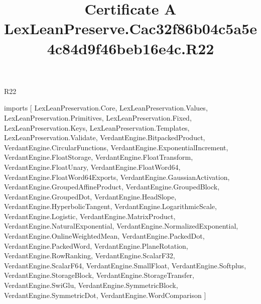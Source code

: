 \begin{lexlean}{R22}
\title{Certificate A LexLeanPreserve.Cac32f86b04c5a5e4c84d9f46beb16e4c.R22}
\begin{coremodule}
imports [
  LexLeanPreservation.Core,
  LexLeanPreservation.Values,
  LexLeanPreservation.Primitives,
  LexLeanPreservation.Fixed,
  LexLeanPreservation.Keys,
  LexLeanPreservation.Templates,
  LexLeanPreservation.Validate,
  VerdantEngine.BitpackedProduct,
  VerdantEngine.CircularFunctions,
  VerdantEngine.ExponentialIncrement,
  VerdantEngine.FloatStorage,
  VerdantEngine.FloatTransform,
  VerdantEngine.FloatUnary,
  VerdantEngine.FloatWord64,
  VerdantEngine.FloatWord64Exports,
  VerdantEngine.GaussianActivation,
  VerdantEngine.GroupedAffineProduct,
  VerdantEngine.GroupedBlock,
  VerdantEngine.GroupedDot,
  VerdantEngine.HeadSlope,
  VerdantEngine.HyperbolicTangent,
  VerdantEngine.LogarithmicScale,
  VerdantEngine.Logistic,
  VerdantEngine.MatrixProduct,
  VerdantEngine.NaturalExponential,
  VerdantEngine.NormalizedExponential,
  VerdantEngine.OnlineWeightedMean,
  VerdantEngine.PackedDot,
  VerdantEngine.PackedWord,
  VerdantEngine.PlaneRotation,
  VerdantEngine.RowRanking,
  VerdantEngine.ScalarF32,
  VerdantEngine.ScalarF64,
  VerdantEngine.SmallFloat,
  VerdantEngine.Softplus,
  VerdantEngine.StorageBlock,
  VerdantEngine.StorageTransfer,
  VerdantEngine.SwiGlu,
  VerdantEngine.SymmetricBlock,
  VerdantEngine.SymmetricDot,
  VerdantEngine.WordComparison
]


\end{coremodule}
\end{lexlean}
